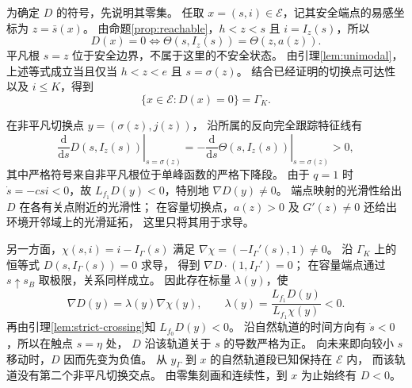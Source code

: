 为确定 $D$ 的符号，先说明其零集。
任取 $x=(s,i)\in\mathcal E$，记其安全端点的易感坐标为 $z=\bar s(x)$。
由命题\ref{prop:reachable}，$h<z<s$ 且 $i=I_z(s)$，所以
\[
D(x)=0
\iff \Theta(s,I_z(s))=\Theta(z,a(z)).
\]
平凡根 $s=z$ 位于安全边界，不属于这里的不安全状态。
由引理\ref{lem:unimodal}，上述等式成立当且仅当
$h<z<e$ 且 $s=\sigma(z)$。
结合已经证明的切换点可达性以及 $i\le K$，得到
\[
\{x\in\mathcal E:D(x)=0\}=\Gamma_K.
\]

在非平凡切换点 $y=(\sigma(z),j(z))$，
沿所属的反向完全跟踪特征线有
\[
\left.\frac{\mathrm d}{\mathrm d s}D(s,I_z(s))\right|_{s=\sigma(z)}
=-\left.\frac{\mathrm d}{\mathrm d s}\Theta(s,I_z(s))\right|_{s=\sigma(z)}>0,
\]
其中严格符号来自非平凡根位于单峰函数的严格下降段。
由于 $q=1$ 时 $\dot s=-csi<0$，故 $L_{f_1}D(y)<0$，特别地
$\nabla D(y)\ne0$。
端点映射的光滑性给出 $D$ 在各有关点附近的光滑性；
在容量切换点，$a(z)>0$ 及 $G'(z)\ne0$ 还给出环境开邻域上的光滑延拓，
这里只将其用于求导。

另一方面，$\chi(s,i)=i-I_\Gamma(s)$ 满足
$\nabla\chi=(-I_\Gamma'(s),1)\ne0$。
沿 $\Gamma_K$ 上的恒等式 $D(s,I_\Gamma(s))=0$ 求导，
得到 $\nabla D\cdot(1,I_\Gamma')=0$；
在容量端点通过 $s\uparrow s_B$ 取极限，关系同样成立。
因此存在标量 $\lambda(y)$，使
\[
\nabla D(y)=\lambda(y)\nabla\chi(y),\qquad
\lambda(y)=\frac{L_{f_1}D(y)}{L_{f_1}\chi(y)}<0.
\]
再由引理\ref{lem:strict-crossing}知 $L_{f_0}D(y)<0$。
沿自然轨道的时间方向有 $\dot s<0$，所以在触点 $s=\eta$ 处，
$D$ 沿该轨道关于 $s$ 的导数严格为正。
向未来即向较小 $s$ 移动时，$D$ 因而先变为负值。
从 $y_\Gamma$ 到 $x$ 的自然轨道段已知保持在 $\mathcal E$ 内，
而该轨道没有第二个非平凡切换交点。
由零集刻画和连续性，到 $x$ 为止始终有 $D<0$。

